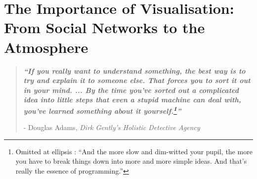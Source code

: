 \documentclass[twoside,openleft,reqno,a4paper,final]{book}
\author{Dan Ellis }
\date{March 2019}
\def\blankpage{%
      \clearpage%
      \thispagestyle{empty}%
      \addtocounter{page}{-2}%
      \null%
      \clearpage}
\begin{document}


\titleformat{\paragraph}[hang]{\normalfont\normalsize\bfseries}{\theparagraph}{1em}{}

\setcounter{secnumdepth}{5}
\setcounter{tocdepth}{4}
\setcounter{page}{200}
\setcounter{chapter}{1}

\cleardoublepage{}











\chapter{ The Importance of Visualisation:  From Social Networks to the Atmosphere }
\cleardoublepage{}
\restoregeometry
\vspace*{0.15\paperheight} 



\begin{center}
\begin{quotation}
  \large{\emph{\textbf{``If you really want to understand something, the best way is to try and explain it to someone else. That forces you to sort it out in your mind. ... By the time you’ve sorted out a complicated idea into little steps that even a stupid machine can deal with, you’ve learned something about it yourself.\footnote{ Omitted at ellipsis : ``And the more slow and dim-witted your pupil, the more you have to break things down into more and more simple ideas. And that’s really the essence of programming.''}''} }  }  \\
  \begin{flushright}
  - Douglas Adams, \textit{Dirk Gently's Holistic Detective Agency} 

  \end{flushright}
 \end{quotation}
\end{center}


\doublespacing

\newpage
\setlength{\footnotesep}{0.5cm}
\raggedbottom %

\tableofcontents
\newpage






 

% 
\end{document}
